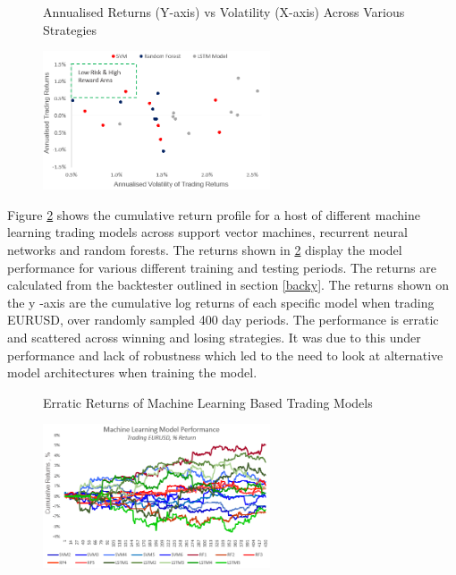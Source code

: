 \documentclass[11pt]{article}
\begin{document}
\begin{figure}[h]
    \centering
	\caption{Annualised Returns (Y-axis) vs Volatility (X-axis) Across Various Strategies}    
	\includegraphics[width=0.6\textwidth]{ErraticRetScatter}
    \label{fig:ErraticRetScatter}
     \caption*{}
\end{figure}


Figure \ref{fig:model_perf} shows the cumulative return profile for a host of different machine learning trading models across support vector machines, recurrent neural networks and random forests. The returns shown in  \ref{fig:model_perf} display the model performance for various different training and testing periods. The returns are calculated from the backtester outlined in section \ref{backy}. The returns shown on the y -axis are the cumulative log returns of each specific model when trading EURUSD, over randomly sampled 400 day periods. The performance is erratic and scattered across winning and losing strategies. It was due to this under performance and lack of robustness which led to the need to look at alternative model architectures when training the model.

\begin{figure}[h]
    \centering
	\caption{Erratic Returns of Machine Learning Based Trading Models}    
	\includegraphics[width=0.6\textwidth]{PoorModelPerf}
    \label{fig:model_perf}
     \caption*{}
\end{figure}
\end{document}
